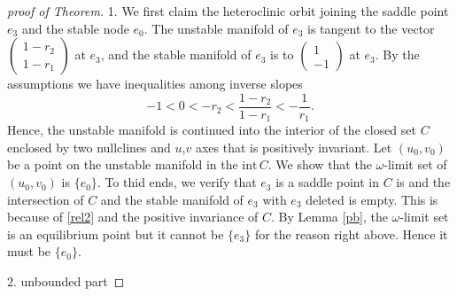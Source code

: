 \documentclass{amsart}
\def\red{\color{red}}
\theoremstyle{definition}
\numberwithin{equation}{section}
\def\ii{{\textrm{int}}\,}
\begin{document}
\begin{proof}[proof of Theorem]
1. We first claim the heteroclinic orbit joining the saddle point $e_3$ and the stable node $e_0$. The unstable manifold of $e_3$ is tangent to the vector $\begin{pmatrix} 1-r_2 \\ 1-r_1 \end{pmatrix}$ at $e_3$, and the stable manifold of $e_3$ is to $\begin{pmatrix} 1 \\ -1 \end{pmatrix}$ at $e_3$. By the assumptions we have inequalities among inverse slopes
\begin{equation} \label{rel2}
 -1<0<-r_2 < \frac{1-r_2}{1-r_1} < -\frac{1}{r_1}.
\end{equation}
Hence, the unstable manifold is continued into the interior of the closed set $C$ enclosed by two nullclines and $u$,$v$ axes that is positively invariant. Let $(u_0,v_0)$ be a point on the unstable manifold in the $\ii C$. We show that the $\omega$-limit set of $(u_0,v_0)$ is $\{e_0\}$. To thid ends, we verify that $e_3$ is a saddle point in $C$ is and the intersection of $C$ and the stable manifold of $e_3$ with $e_3$ deleted is empty. This is because of \eqref{rel2} and the positive invariance of $C$. By Lemma \ref{pb}, the $\omega$-limit set is an equilibrium point but it cannot be $\{e_3\}$ for the reason right above. Hence it must be $\{e_0\}$.

2. {\red unbounded part}

% 
% 



\end{proof}
\end{document}

